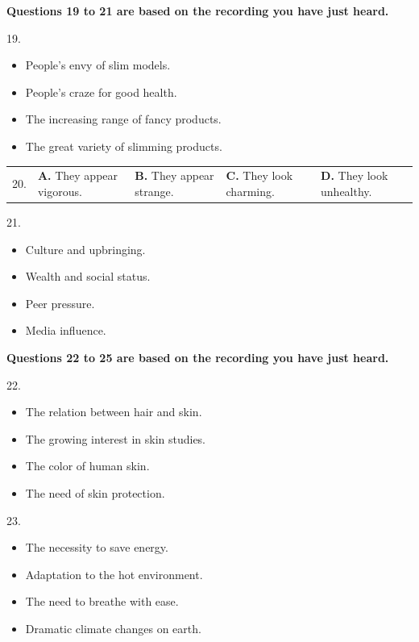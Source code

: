 \documentclass[UTF8,11pt]{ctexart}
\begin{document}
\textbf{Questions 19 to 21 are based on the recording you have just heard.}


19.


\begin{itemize}[leftmargin=2em,itemsep=.2em,topsep=.4em]\item[A.] People’s envy of slim models.
\item[B.] People’s craze for good health.
\item[C.] The increasing range of fancy products.
\item[D.] The great variety of slimming products.
\end{itemize}

\noindent\begin{tabularx}{\linewidth}{@{}lXXXX@{}}20. & \textbf{A.} They appear vigorous. & \textbf{B.} They appear strange. & \textbf{C.} They look charming. & \textbf{D.} They look unhealthy.\\\end{tabularx}\par

21.


\begin{itemize}[leftmargin=2em,itemsep=.2em,topsep=.4em]\item[A.] Culture and upbringing.
\item[B.] Wealth and social status.
\end{itemize}

\begin{itemize}[leftmargin=2em,itemsep=.2em,topsep=.4em]\item[C.] Peer pressure.
\item[D.] Media influence.
\end{itemize}

\textbf{Questions 22 to 25 are based on the recording you have just heard.}


22.


\begin{itemize}[leftmargin=2em,itemsep=.2em,topsep=.4em]\item[A.] The relation between hair and skin.
\item[B.] The growing interest in skin studies.
\item[C.] The color of human skin.
\item[D.] The need of skin protection.
\end{itemize}

23.


\begin{itemize}[leftmargin=2em,itemsep=.2em,topsep=.4em]\item[A.] The necessity to save energy.
\item[B.] Adaptation to the hot environment.
\item[C.] The need to breathe with ease.
\item[D.] Dramatic climate changes on earth.
\end{itemize}
\end{document}
